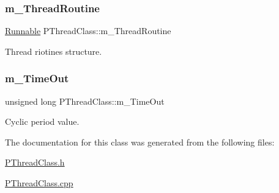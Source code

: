 \mbox{\label{classPThreadClass_a80e0b0007257f5c9ef8d74ddacac4113}} 
\subsubsection{\texorpdfstring{m\+\_\+\+Thread\+Routine}{m\_ThreadRoutine}}
{\footnotesize\ttfamily \hyperlink{structRunnable}{Runnable} P\+Thread\+Class\+::m\+\_\+\+Thread\+Routine\hspace{0.3cm}{\ttfamily [protected]}}



Thread riotines structure. 

\mbox{\label{classPThreadClass_a73118712c992ed9921a928cf676bf4d6}} 
\subsubsection{\texorpdfstring{m\+\_\+\+Time\+Out}{m\_TimeOut}}
{\footnotesize\ttfamily unsigned long P\+Thread\+Class\+::m\+\_\+\+Time\+Out\hspace{0.3cm}{\ttfamily [protected]}}



Cyclic period value. 



The documentation for this class was generated from the following files\+:\begin{DoxyCompactItemize}
\item 
\hyperlink{PThreadClass_8h}{P\+Thread\+Class.\+h}\item 
\hyperlink{PThreadClass_8cpp}{P\+Thread\+Class.\+cpp}\end{DoxyCompactItemize}

